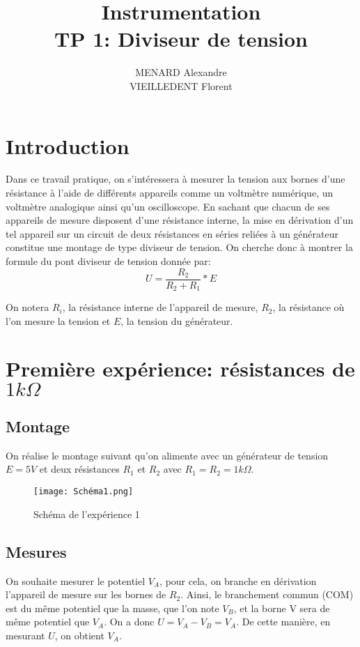 \documentclass[10pt]{article}
\title{\textbf{Instrumentation} \\ TP 1: Diviseur de tension}
\author{MENARD Alexandre \\ VIEILLEDENT Florent}
\begin{document}
\maketitle

\section*{Introduction}
Dans ce travail pratique, on s'intéressera à mesurer la tension aux bornes d'une résistance à l'aide de différents appareils 
comme un voltmètre numérique, un voltmètre analogique ainsi qu'un oscilloscope. En sachant que chacun de ses appareils de mesure
disposent d'une résistance interne, la mise en dérivation d'un tel appareil sur un circuit de deux résistances en séries reliées à 
un générateur constitue une montage de type diviseur de tension. On cherche donc à montrer la formule du pont diviseur de tension 
donnée par:
\begin{equation}
    U = \frac{R_2}{R_2 + R_1} * E
    \label{eqn:diviseur_tension}
\end{equation}

On notera $R_i$, la résistance interne de l'appareil de mesure, $R_2$, la résistance où l'on mesure la tension et $E$, la tension du 
générateur.

\section{Première expérience: résistances de $1k \Omega$}
\subsection{Montage}

On réalise le montage suivant qu'on alimente avec un générateur de tension $E=5V$ et deux résistances $R_1$ et $R_2$ avec $R_1=R_2=1k\Omega$.

\begin{figure}[!htbp]
    \begin{center}
       \texttt{[image: Schéma1.png]}
        \label{fig:schema1}
        \caption{Schéma de l'expérience 1}
    \end{center}
\end{figure}

\newpage
\subsection{Mesures}
On souhaite mesurer le potentiel $V_A$, pour cela, on branche en dérivation l'appareil de mesure sur les bornes de $R_2$. Ainsi, 
le branchement commun (COM) est du même potentiel que la masse, que l'on note $V_B$, et la borne V sera de même potentiel 
que $V_A$. On a donc $U = V_A - V_B = V_A$. De cette manière, en mesurant $U$, on obtient $V_A$.
\end{document}
